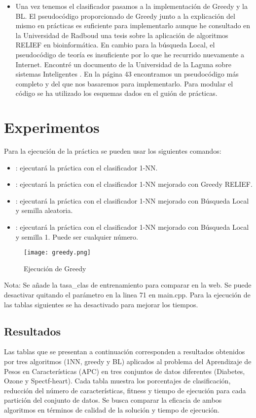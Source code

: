 \begin{itemize}
	\item Una vez tenemos el clasificador pasamos a la implementación de Greedy y la BL. El pseudocódigo proporcionado de Greedy junto a la explicación del mismo en prácticas es suficiente para implementarlo aunque he consultado en la Universidad de Radboud \cite{runl} una tesis sobre la aplicación de algoritmos RELIEF en bioinformática. En cambio para la búsqueda Local, el pseudocódigo de teoría es insuficiente por lo que he recurrido nuevamente a Internet. Encontré un documento de la Universidad de la Laguna sobre sistemas Inteligentes \cite{ull}. En la página 43 encontramos un pseudocódigo más completo y del que nos basaremos para implementarlo. Para modular el código se ha utilizado los esquemas dados en el guión de prácticas.
\end{itemize}

\section{Experimentos}
Para la ejecución de la práctica se pueden usar los siguientes comandos:
\begin{itemize}
	\item {}: ejecutará la práctica con el clasificador 1-NN.
	\item {}: ejecutará la práctica con el clasificador 1-NN mejorado con Greedy RELIEF.
	\item {}: ejecutará la práctica con el clasificador 1-NN mejorado con Búsqueda Local y semilla aleatoria.
	\item {}: ejecutará la práctica con el clasificador 1-NN mejorado con Búsqueda Local y semilla 1. Puede ser cualquier número.
\end{itemize}

\begin{figure}[h]
	\centering
	\texttt{[image: greedy.png]}
	\caption{Ejecución de Greedy}
	\label{fig:greedy}
\end{figure}
Nota: Se añade la tasa\_clas de entrenamiento para comparar en la web. Se puede desactivar quitando el parámetro  en la linea 71 en main.cpp. Para la ejecución de las tablas siguientes se ha desactivado para mejorar los tiempos. \\

\subsection{Resultados}
Las tablas que se presentan a continuación corresponden a resultados obtenidos por tres algoritmos (1NN, greedy y BL) aplicados al problema del Aprendizaje de Pesos en Características (APC) en tres conjuntos de datos diferentes (Diabetes, Ozone y Spectf-heart). Cada tabla muestra los porcentajes de clasificación, reducción del número de características, fitness y tiempo de ejecución para cada partición del conjunto de datos. Se busca comparar la eficacia de ambos algoritmos en términos de calidad de la solución y tiempo de ejecución.

